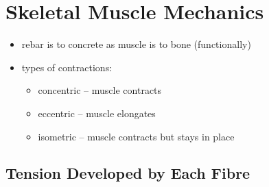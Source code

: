 \documentclass[10pt]{article}
\begin{document}
\section{Skeletal Muscle Mechanics}
\begin{itemize}
    \item rebar is to concrete as muscle is to bone (functionally)
    \item types of contractions:
        \begin{itemize}
            \item concentric -- muscle contracts
            \item eccentric -- muscle elongates
            \item isometric -- muscle contracts but stays in place
        \end{itemize}
\end{itemize}

\subsection{Tension Developed by Each Fibre}
\end{document}
